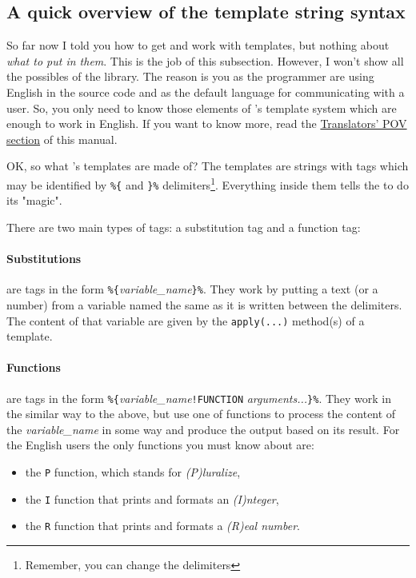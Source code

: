 \subsection{A quick overview of the template string syntax}
So far now I told you how to get and work with templates, but nothing about \emph{what to put in them}. 
This is the job of this subsection. However, I won't show all the possibles of the \mulan{} library.
The reason is you as the programmer are using English in the source code and as the default language for communicating with a user. 
So, you only need to know those elements of \mulan{}'s template system which are enough to work in English. 
If you want to know more, read the \hyperref[transPOV]{Translators' POV section} of this manual. 

OK, so what \mulan{}'s templates are made of? 
The templates are strings with tags which may be identified by \verb+%{+ and \verb+}%+ delimiters\footnote{Remember, you can change the delimiters}.
Everything inside them tells the \mulan{} to do its "magic". 

There are two main types of tags: a substitution tag and a function tag:
\paragraph{Substitutions} are tags in the form \verb+%{+\textit{variable\_name}\verb+}%+. They work by putting a text (or a number) from a variable named the same as it is written between the delimiters.
The content of that variable are given by the \verb+apply(...)+ method(s) of a template. 

\paragraph{Functions} are tags in the form \verb+%{+\textit{variable\_name}\verb+!FUNCTION+ \textit{arguments...}\verb+}%+.
They work in the similar way to the above, but use one of \mulan{} functions to process the content of the \textit{variable\_name} in some way and produce the output based on its result.
For the English users the only functions you must know about are:
\begin{itemize}
 \item the \texttt{P} function, which stands for \textit{(P)luralize},
 \item the \texttt{I} function that prints and formats an \textit{(I)nteger},
 \item the \texttt{R} function that prints and formats a \textit{(R)eal number}.
\end{itemize}

